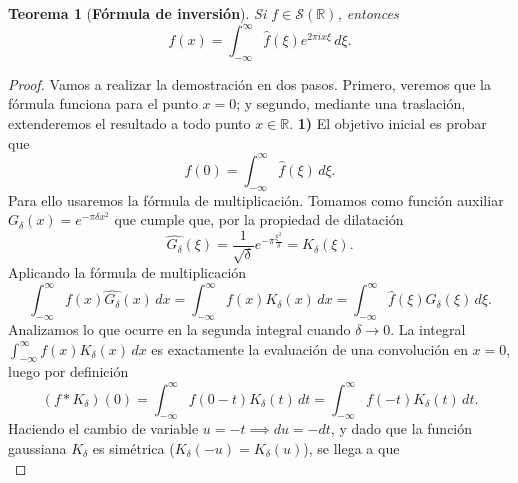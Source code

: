 \documentclass[12pt]{article}
\newcommand{\R}{\mathbb{R}}
\newcommand{\Sc}{\mathcal{S}(\mathbb{R})}
\theoremstyle{plain}
\newtheorem{teorema}{Teorema}[section] %
\theoremstyle{definition}
\numberwithin{equation}{section}
\begin{document}
            \begin{teorema}[\textbf{Fórmula de inversión}]
                Si \(f \in \Sc\), entonces
                \begin{equation*}
                    f(x) = \int_{-\infty}^{\infty} \hat{f}(\xi)e^{2\pi ix\xi} \,d\xi.
                \end{equation*}
            \end{teorema}
            \begin{proof}
                Vamos a realizar la demostración en dos pasos. Primero, veremos que la fórmula funciona para el punto \(x = 0\); y segundo, mediante una traslación, extenderemos el resultado a todo punto \(x \in \R\).
                \textbf{1)} El objetivo inicial es probar que
                \begin{equation*}
                    f(0) = \int_{-\infty}^{\infty} \hat{f}(\xi) \,d\xi.
                \end{equation*}
                Para ello usaremos la fórmula de multiplicación. Tomamos como función auxiliar \(G_\delta(x) = e^{-\pi \delta x^2}\) que cumple que, por la propiedad de dilatación
                \begin{equation*}
                    \widehat{G_\delta}(\xi) = \frac{1}{\sqrt{\delta}} e^{-\pi \frac{\xi^2}{\delta}} = K_\delta(\xi).
                \end{equation*}
                Aplicando la fórmula de multiplicación
                \begin{equation*}
                    \int_{-\infty}^{\infty} f(x)\widehat{G_\delta}(x) \,dx = \int_{-\infty}^{\infty} f(x)K_\delta(x) \,dx = \int_{-\infty}^{\infty} \hat{f}(\xi)G_\delta(\xi) \,d\xi.
                \end{equation*}
                Analizamos lo que ocurre en la segunda integral cuando \(\delta \to 0\). La integral \(\int_{-\infty}^{\infty} f(x)K_\delta(x) \,dx\) es exactamente la evaluación de una convolución en \(x = 0\), luego por definición
                \begin{equation*}
                    (f * K_\delta)(0) = \int_{-\infty}^{\infty} f(0-t)K_\delta(t) \,dt = \int_{-\infty}^{\infty} f(-t)K_\delta(t) \,dt.
                \end{equation*}
                Haciendo el cambio de variable \(u = -t \implies du = -dt\), y dado que la función gaussiana \(K_\delta\) es simétrica (\(K_\delta(-u) = K_\delta(u)\)), se llega a que
                \begin{equation*}

\end{equation*}
\end{proof}
\end{document}
